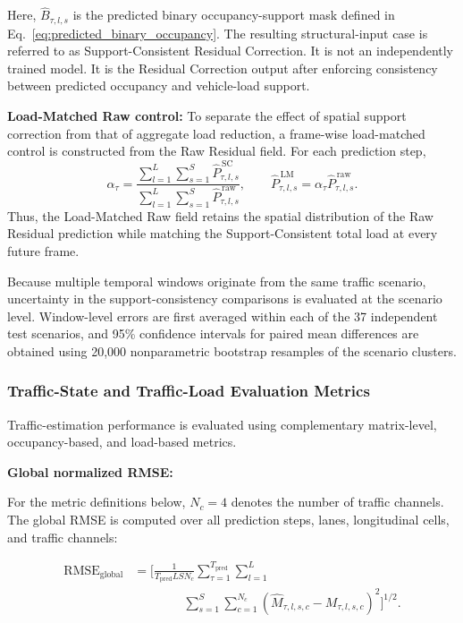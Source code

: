 \documentclass[journal]{IEEEtran}
\begin{document}
Here, $\widehat{B}_{\tau,l,s}$ is the predicted binary occupancy-support mask
defined in Eq.~\eqref{eq:predicted_binary_occupancy}.
The resulting
structural-input case is referred to as Support-Consistent Residual Correction.
It is not an independently trained model. It is the Residual Correction output after enforcing consistency between predicted occupancy and vehicle-load support.

{\color{blue}
\textbf{Load-Matched Raw control:}
To separate the effect of spatial support correction from that of aggregate load reduction, a frame-wise load-matched control is constructed from the Raw Residual field. For each prediction step,
\begin{equation}
\alpha_{\tau}
=
\frac{
\sum_{l=1}^{L}\sum_{s=1}^{S}
\widehat{P}^{\,\mathrm{SC}}_{\tau,l,s}
}{
\sum_{l=1}^{L}\sum_{s=1}^{S}
\widehat{P}^{\,\mathrm{raw}}_{\tau,l,s}
},
\qquad
\widehat{P}^{\,\mathrm{LM}}_{\tau,l,s}
=
\alpha_{\tau}
\widehat{P}^{\,\mathrm{raw}}_{\tau,l,s}.
\label{eq:load_matched_control}
\end{equation}
Thus, the Load-Matched Raw field retains the spatial distribution of the Raw Residual prediction while matching the Support-Consistent total load at every future frame.

Because multiple temporal windows originate from the same traffic scenario, uncertainty in the support-consistency comparisons is evaluated at the scenario level. Window-level errors are first averaged within each of the 37 independent test scenarios, and 95\% confidence intervals for paired mean differences are obtained using 20,000 nonparametric bootstrap resamples of the scenario clusters.
}


\subsubsection{Traffic-State and Traffic-Load Evaluation Metrics}

Traffic-estimation
performance is evaluated using complementary matrix-level, occupancy-based, and
load-based metrics.

\textbf{Global normalized RMSE:}

For the metric definitions below, $N_c=4$ denotes the number of traffic channels. The global RMSE is computed over all prediction steps, lanes, longitudinal cells, and traffic channels:

\begin{equation}
\begin{aligned}
\mathrm{RMSE}_{\mathrm{global}}
&=
\Bigg[
\frac{1}
{T_{\mathrm{pred}}LSN_c}
\sum_{\tau=1}^{T_{\mathrm{pred}}}
\sum_{l=1}^{L}
\\
&\qquad\qquad
\sum_{s=1}^{S}
\sum_{c=1}^{N_c}
\left(
\widehat{M}_{\tau,l,s,c}
-
M_{\tau,l,s,c}
\right)^2
\Bigg]^{1/2}.
\end{aligned}
\end{equation}
\end{document}

